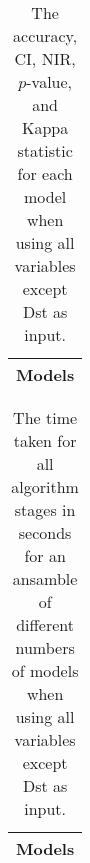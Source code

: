 \begin{table}[!ht]
	\centering
	\begin{tabular}{|c|}
		\hline
		Models \\ \hline
	\end{tabular}
	\caption{The accuracy, CI, NIR, $p$-value, and Kappa statistic for each model when using all variables except Dst as input.}
	\label{tab:time:ansamble:noDst}
\end{table}

\begin{table}[!ht]
	\centering
	\begin{tabular}{|c|}
		\hline
		Models \\ \hline
	\end{tabular}
	\caption{The time taken for all algorithm stages in seconds for an ansamble of different numbers of models when using all variables except Dst as input.}
	\label{tab:time:ansamble:reverse:noDst}
\end{table}
